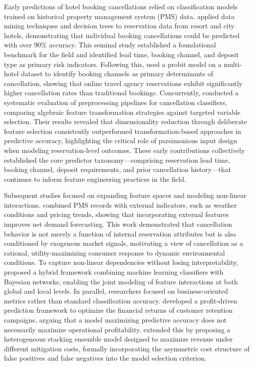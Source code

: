 \documentclass[pdflatex,iicol,sn-mathphys-ay]{sn-jnl}
\theoremstyle{thmstyleone}%
\theoremstyle{thmstyletwo}%
\theoremstyle{thmstylethree}%
\begin{document}
Early predictions of hotel booking cancellations relied on classification models trained on historical property management system (PMS) data. \cite{antonio2017predicting} applied data mining techniques and decision trees to reservation data from resort and city hotels, demonstrating that individual booking cancellations could be predicted with over 90\% accuracy. This seminal study established a foundational benchmark for the field and identified lead time, booking channel, and deposit type as primary risk indicators. Following this, \cite{falk2018modelling} used a probit model on a multi-hotel dataset to identify booking channels as primary determinants of cancellation, showing that online travel agency reservations exhibit significantly higher cancellation rates than traditional bookings. Concurrently, \cite{satu2020performance} conducted a systematic evaluation of preprocessing pipelines for cancellation classifiers, comparing algebraic feature transformation strategies against targeted variable selection. Their results revealed that dimensionality reduction through deliberate feature selection consistently outperformed transformation-based approaches in predictive accuracy, highlighting the critical role of parsimonious input design when modeling reservation-level outcomes. These early contributions collectively established the core predictor taxonomy—comprising reservation lead time, booking channel, deposit requirements, and prior cancellation history—that continues to inform feature engineering practices in the field.

Subsequent studies focused on expanding feature spaces and modeling non-linear interactions. \cite{antonio2019big} combined PMS records with external indicators, such as weather conditions and pricing trends, showing that incorporating external features improves net demand forecasting. This work demonstrated that cancellation behavior is not merely a function of internal reservation attributes but is also conditioned by exogenous market signals, motivating a view of cancellation as a rational, utility-maximizing consumer response to dynamic environmental conditions. To capture non-linear dependencies without losing interpretability, \cite{chen2023prediction} proposed a hybrid framework combining machine learning classifiers with Bayesian networks, enabling the joint modeling of feature interactions at both global and local levels. In parallel, researchers focused on business-oriented metrics rather than standard classification accuracy. \cite{liu2023hospitality} developed a profit-driven prediction framework to optimize the financial returns of customer retention campaigns, arguing that a model maximizing predictive accuracy does not necessarily maximize operational profitability. \cite{liu2025explainable} extended this by proposing a heterogeneous stacking ensemble model designed to maximize revenue under different mitigation costs, formally incorporating the asymmetric cost structure of false positives and false negatives into the model selection criterion.
\end{document}
